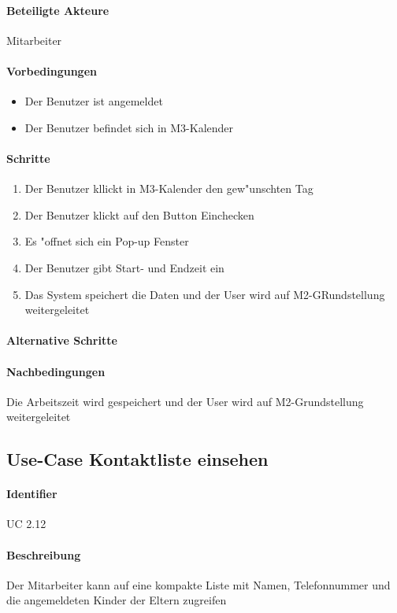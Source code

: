   \paragraph{Beteiligte Akteure}   \leavevmode \newline
    Mitarbeiter
  \paragraph{Vorbedingungen}
  \begin{itemize}
   \item Der Benutzer ist angemeldet
   \item Der Benutzer befindet sich in M3-Kalender
  \end{itemize}

  \paragraph{Schritte}
  \begin{enumerate}
   \item Der Benutzer kllickt in M3-Kalender den gew"unschten Tag
   \item Der Benutzer klickt auf den Button \dq Einchecken\dq
   \item Es "offnet sich ein Pop-up Fenster
   \item Der Benutzer gibt Start- und Endzeit ein
   \item Das System speichert die Daten und der User wird auf M2-GRundstellung weitergeleitet
  \end{enumerate}

  \paragraph{Alternative Schritte}
  \paragraph{Nachbedingungen}
  Die Arbeitszeit wird gespeichert und der User wird auf M2-Grundstellung weitergeleitet
  
  \newpage
 \subsection{Use-Case Kontaktliste einsehen}
  \paragraph{Identifier}
  UC 2.12
  \paragraph{Beschreibung}
  Der Mitarbeiter kann auf eine kompakte Liste mit Namen, Telefonnummer und die angemeldeten Kinder der Eltern zugreifen 
